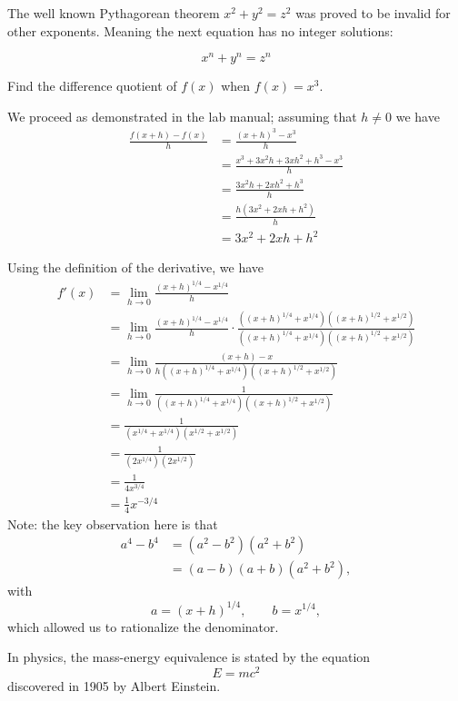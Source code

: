 The well known Pythagorean theorem \(x^2 + y^2 = z^2\) was 
proved to be invalid for other exponents. 
Meaning the next equation has no integer solutions:

\[ x^n + y^n = z^n \]

Find the difference quotient of $f(x)$ when $f(x)=x^3$.

We proceed as demonstrated in the lab manual; assuming that $h\ne 0$ 
we have
\begin{align*}
    \frac{f(x+h)-f(x)}{h} & =  \frac{(x+h)^3-x^3}{h}   \\
                          & =  \frac{x^3+3x^2h+3xh^2+h^3 - x^3}{h}\\
                          & =  \frac{3x^2h+2xh^2+h^3}{h}\\
                          & =  \frac{h(3x^2+2xh+h^2)}{h}\\
                          & =  3x^2+2xh+h^2
\end{align*} 

Using the definition of the derivative, we have
\begin{align*}
            f'(x)           &= \lim_{h\rightarrow 0}\frac{(x+h)^{1/4}-x^{1/4}}{h}   \\
                            &=  \lim_{h\rightarrow 0}\frac{(x+h)^{1/4}-x^{1/4}}{h}\cdot \frac{((x+h)^{1/4}+x^{1/4})((x+h)^{1/2}+x^{1/2})}{((x+h)^{1/4}+x^{1/4})((x+h)^{1/2}+x^{1/2})}\\
                            &=  \lim_{h\rightarrow 0}\frac{(x+h)-x}{h((x+h)^{1/4}+x^{1/4})((x+h)^{1/2}+x^{1/2})}    \\  
                            &=  \lim_{h\rightarrow 0}\frac{1}{((x+h)^{1/4}+x^{1/4})((x+h)^{1/2}+x^{1/2})}   \\
                            &= \frac{1}{(x^{1/4}+x^{1/4})(x^{1/2}+x^{1/2})} \\
                            &=  \frac{1}{(2x^{1/4})(2x^{1/2})}  \\
                            &=  \frac{1}{4x^{3/4}}  \\
                            &=  \frac{1}{4}x^{-3/4}
\end{align*}
Note: the key observation here is that
\begin{align*}
    a^4-b^4 &= (a^2-b^2)(a^2+b^2)   \\
        &= (a-b)(a+b)(a^2+b^2), 
\end{align*}
with 
\[
    a = (x+h)^{1/4}, \qquad b = x^{1/4},
\]
which allowed us to rationalize the denominator.

In physics, the mass-energy equivalence is stated 
by the equation \begin{equation}E=mc^2\end{equation} discovered in 1905 by Albert Einstein.

\clearpage